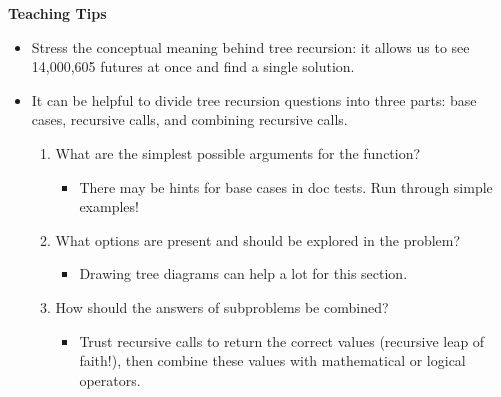 \begin{blocksection}
\begin{guide}
\textbf{Teaching Tips}
\begin{itemize}
    \item Stress the conceptual meaning behind tree recursion: it allows us to see 14,000,605 futures at once and find a single solution.
    \item It can be helpful to divide tree recursion questions into three parts: base cases, recursive calls, and combining recursive calls.
    \begin{enumerate}
        \item What are the simplest possible arguments for the function?
        \begin{itemize}
            \item There may be hints for base cases in doc tests. Run through simple examples!
        \end{itemize}
        \item What options are present and should be explored in the problem?
        \begin{itemize}
            \item Drawing tree diagrams can help a lot for this section.
        \end{itemize}
        \item How should the answers of subproblems be combined?
        \begin{itemize}
            \item Trust recursive calls to return the correct values (recursive leap of faith!), then combine these values with mathematical or logical operators.
        \end{itemize}
    \end{enumerate}
\end{itemize}
\end{guide}
\end{blocksection}
